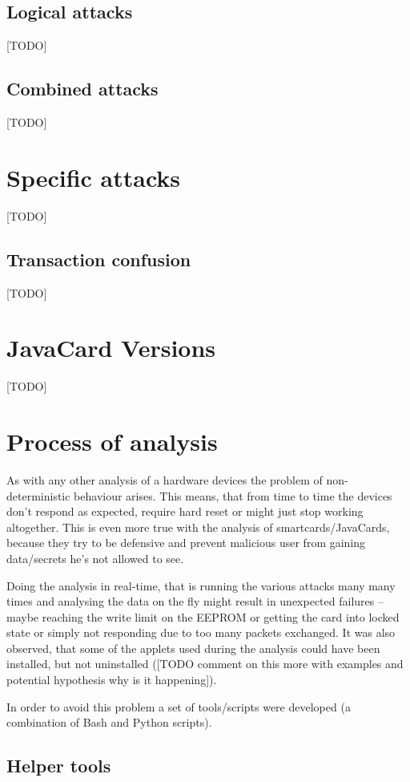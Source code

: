 \documentclass[a4paper]{scrartcl}
\begin{document}
\subsection{Logical attacks}
[TODO]
\subsection{Combined attacks}
[TODO]

\section{Specific attacks}
[TODO]

\subsection{Transaction confusion}
[TODO]


\section{JavaCard Versions}
[TODO]

\section{Process of analysis}

As with any other analysis of a hardware devices the problem of non-deterministic behaviour arises. This means, that from time to time the devices don't respond as expected, require hard reset or might just stop working altogether. This is even more true with the analysis of smartcards/JavaCards, because they try to be defensive and prevent malicious user from gaining data/secrets he's not allowed to see.

Doing the analysis in real-time, that is running the various attacks many many times and analysing the data on the fly might result in unexpected failures -- maybe reaching the write limit on the EEPROM or getting the card into locked state or simply not responding due to too many packets exchanged. It was also observed, that some of the applets used during the analysis could have been installed, but not uninstalled ([TODO comment on this more with examples and potential hypothesis why is it happening]).

In order to avoid this problem a set of tools/scripts were developed (a combination of Bash and Python scripts).

\subsection{Helper tools}
\end{document}
